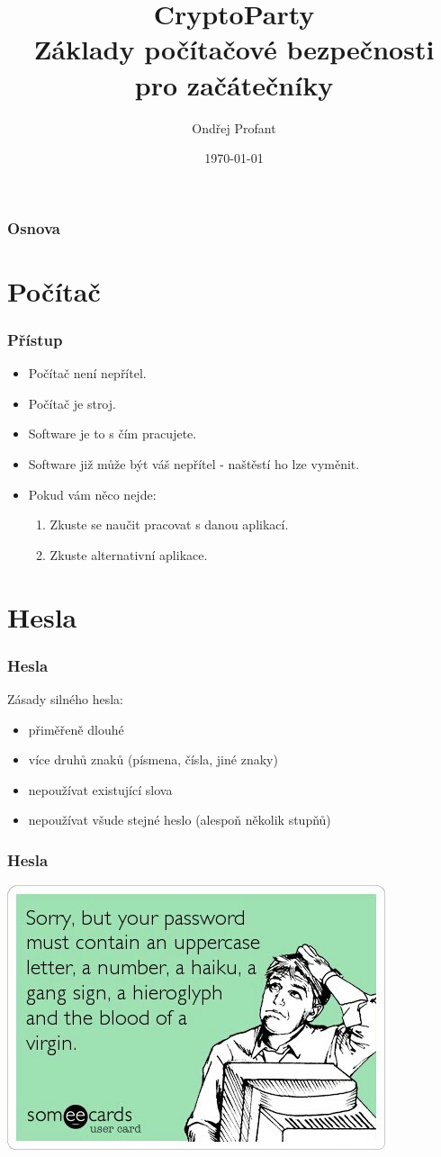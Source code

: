 \documentclass[xetex]{beamer}
\title{CryptoParty\\Základy počítačové bezpečnosti\\pro začátečníky}
\author{Ondřej Profant}
\institute[Piráti]{Česká pirátská strana}
\date{\today}
\begin{document}
\begin{frame}
  \titlepage
\end{frame}

\begin{frame}
  \frametitle{Osnova}
  \tableofcontents
\end{frame}	

\section{Počítač}
\begin{frame}
 \frametitle{Přístup}
 \begin{itemize}
  \item Počítač není nepřítel.
  \item Počítač je stroj.
  \item Software je to s čím pracujete.
  \item Software již může být váš nepřítel - naštěstí ho lze vyměnit.
  \item Pokud vám něco nejde:
   \begin{enumerate}
    \item Zkuste se naučit pracovat s danou aplikací.
    \item Zkuste alternativní aplikace.
   \end{enumerate}
 \end{itemize}
\end{frame}

\section{Hesla}

\begin{frame}
 \frametitle{Hesla}
 Zásady silného hesla:
 \begin{itemize} 
   \item přiměřeně dlouhé
   \item více druhů znaků (písmena, čísla, jiné znaky)
   \item nepoužívat existující slova 
   \item nepoužívat všude stejné heslo (alespoň několik stupňů)
 \end{itemize}
\end{frame}

\begin{frame}
	\frametitle{Hesla}
	\includegraphics[scale=0.5]{pic/heslo.jpg}
\end{frame}
\end{document}
